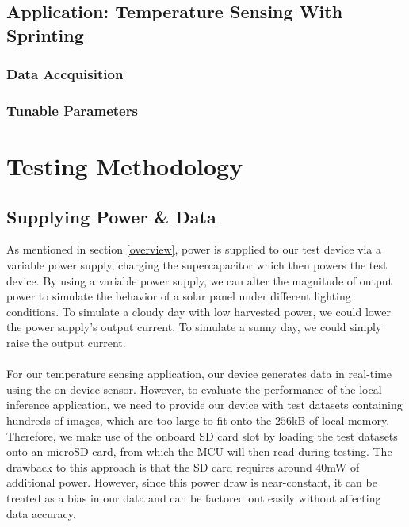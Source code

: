 \documentclass[twoside]{report}
\begin{document}
\subsection{Application: Temperature Sensing With Sprinting}
\subsubsection{Data Accquisition}
\subsubsection{Tunable Parameters}
 
\section{Testing Methodology} \label{sec:testMethod}
\subsection{Supplying Power \& Data}
As mentioned in section \ref{overview}, power is supplied to our test device via a variable power supply, 
charging the supercapacitor which then powers the test device. By using a variable power supply, 
we can alter the magnitude of output power to simulate the behavior of a solar panel under 
different lighting conditions. To simulate a cloudy day with low harvested power, we could lower the power 
supply's output current. To simulate a sunny day, we could simply raise the output current.\\\\
For our temperature sensing application, our device generates data in real-time using the on-device sensor. 
However, to evaluate the performance of the local inference application, 
we need to provide our device with test datasets containing hundreds of images, which are too large to fit onto the $256$kB of 
local memory. Therefore, we make use of the onboard SD card slot by loading the test datasets onto 
an microSD card, from which the MCU will then read during testing. The drawback to this approach 
is that the SD card requires around $40$mW of additional power. However, since this power draw is 
near-constant, it can be treated as a bias in our data and can be factored out easily without 
affecting data accuracy.
\end{document}
